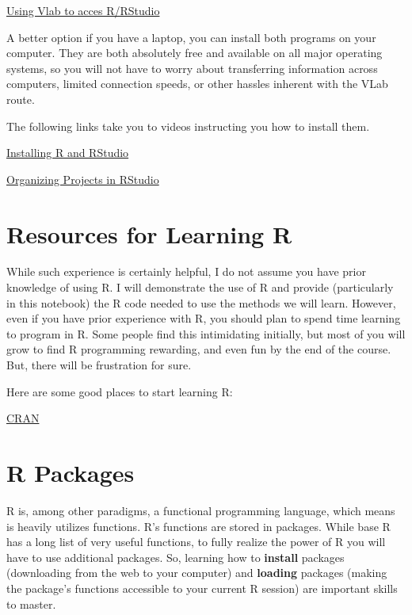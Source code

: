 \documentclass[
]{book}
\begin{document}
\href{https://nv.instructuremedia.com/fetch/QkFoYkIxc0hhUVNIRGFrSE1Hd3JCeWhUREdFPS0tZjk4ODFlYWEyZWFiNWQwYWYyZDk0YTZjMjljZTJlMjBkNmIwMzE5Yw.mp4}{Using Vlab to acces R/RStudio}

A better option if you have a laptop, you can install both programs on your computer.
They are both absolutely free and available on all major operating systems, so you will not have to worry about transferring information across computers, limited connection speeds, or other hassles inherent with the VLab route.

The following links take you to videos instructing you how to install them.

\href{https://auburn.hosted.panopto.com/Panopto/Pages/Viewer.aspx?id=5dacd1fe-b888-407b-a89f-ac150135ace8}{Installing R and RStudio}

\href{https://auburn.hosted.panopto.com/Panopto/Pages/Viewer.aspx?id=aed0e2a9-004f-453f-80c7-abbe010a063b}{Organizing Projects in RStudio}

\hypertarget{resources-for-learning-r}{%
\section*{Resources for Learning R}\label{resources-for-learning-r}}

While such experience is certainly helpful, I do not assume you have prior knowledge of using R.
I will demonstrate the use of R and provide (particularly in this notebook) the R code needed to use the methods we will learn.
However, even if you have prior experience with R, you should plan to spend time learning to program in R.
Some people find this intimidating initially, but most of you will grow to find R programming rewarding, and even fun by the end of the course.
But, there will be frustration for sure.

Here are some good places to start learning R:

\href{https://cran.r-project.org/}{CRAN}

\hypertarget{r-packages}{%
\section*{R Packages}\label{r-packages}}

R is, among other paradigms, a functional programming language, which means is heavily utilizes functions.
R's functions are stored in packages.
While base R has a long list of very useful functions, to fully realize the power of R you will have to use additional packages.
So, learning how to \textbf{install} packages (downloading from the web to your computer) and \textbf{loading} packages (making the package's functions accessible to your current R session) are important skills to master.
\end{document}
